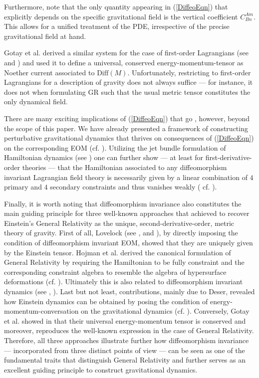 \documentclass[%
preprint,
nofootinbib,
amsmath,amssymb,
aps,
prd,
floatfix,
]{revtex4-2}
\begin{document}
Furthermore, note that the only quantity appearing in (\ref{DiffeoEqn}) that explicitly depends on the specific gravitational field is the vertical coefficient $C^{Am}_{Bn}$. This allows for a unified treatment of the PDE, irrespective of the precise gravitational field at hand. 

\iffalse
Similar equations were already obtained in the context of variational calculus and gauge symmetries (cf. \cite{article}). 
\fi
Gotay et al. derived a similar system for the case of first-order Lagrangians (see \cite{Gotay1992StressEnergyMomentumTA} and \cite{1998physics...1019G}) and used it to define a universal, conserved energy-momentum-tensor as Noether current associated to $\mathrm{Diff}(M)$. 
Unfortunately, restricting to first-order Lagrangians for a description of gravity does not always suffice --- for instance, it does not when formulating GR such that the usual metric tensor constitutes the only dynamical field.

There are many exciting implications of (\ref{DiffeoEqn}) that go , however, beyond the scope of this paper. We have already presented a framework of constructing perturbative gravitational dynamics that thrives on consequences of (\ref{DiffeoEqn}) on the corresponding EOM (cf. \cite{TobiR}).
Utilizing the jet bundle formulation of Hamiltonian dynamics (see \cite{2004math.ph..11032G}) one can further show --- at least for first-derivative-order theories --- that the Hamiltonian associated to any diffeomorphism invariant Lagrangian field theory is necessarily given by a linear combination of $4$ primary and $4$ secondary constraints and thus vanishes weakly ( cf. \cite{TobiMaster}).

Finally, it is worth noting that diffeomorphism invariance also constitutes the main guiding principle for three well-known approaches that achieved to recover Einstein's General Relativity as the unique, second-derivative-order, metric theory of gravity. 
First of all, Lovelock (see \cite{Lovelock1969}, \cite{doi:10.1063/1.1665613} and \cite{doi:10.1063/1.1666069}), by directly imposing the condition of diffeomorphism invariant EOM, showed that they are uniquely given by the Einstein tensor.
Hojman et al. derived the canonical formulation of General Relativity by requiring the Hamiltonian to be fully constraint and the corresponding constraint algebra to resemble the algebra of hypersurface deformations (cf. \cite{HOJMAN197688}).
Ultimately this is also related to diffeomorphism invariant dynamics (see \cite{TobiMaster}, \cite{bojowald_2010}).
Last but not least, contributions, mainly due to Deser, revealed how Einstein dynamics can be obtained by posing the condition of energy-momentum-conversation on the gravitational dynamics (cf. \cite{1970GReGr...1....9D}).
Conversely, Gotay et al. showed in \cite{Gotay1992StressEnergyMomentumTA} that their universal energy-momentum tensor is conserved and moreover, reproduces the well-known expression in the case of General Relativity.
Therefore, all three approaches illustrate further how diffeomorphism invariance --- incorporated from three distinct points of view --- can be seen as one of the fundamental traits that distinguish General Relativity and further serves as an excellent guiding principle to construct gravitational dynamics.
\end{document}
